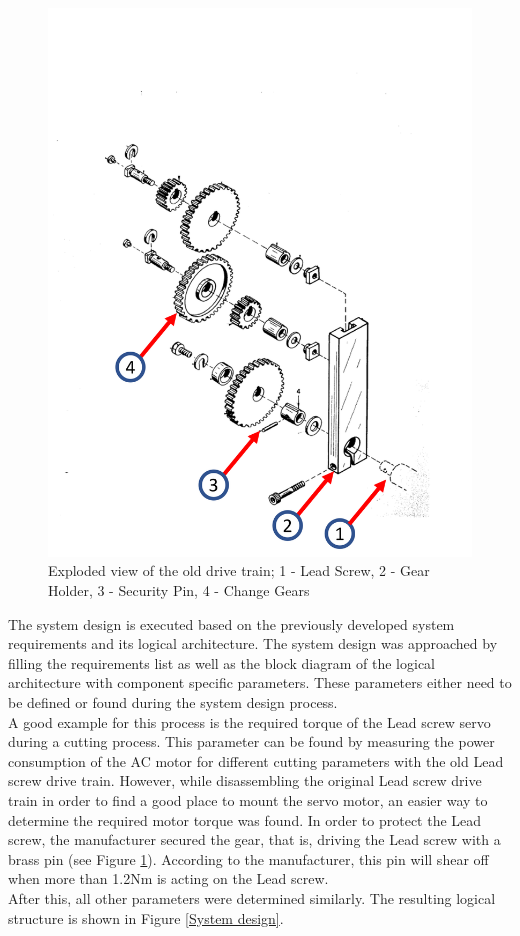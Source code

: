 \begin{figure}
    \begin{center}
    \includegraphics[width=12cm]{Pictures/SecPin.png}
    \caption[Exploded view of the old drive train]{Exploded view of the old drive train; 1 - Lead Screw, 2 - Gear Holder, 3 - Security Pin, 4 - Change Gears}
    \label{SecPin}
    \end{center}
\end{figure}
 
The system design is executed based on the previously developed system requirements and its logical architecture. The system design was approached by filling the requirements list as well as the block diagram of the logical architecture with component specific parameters. These parameters either need to be defined or found during the system design process.\\
A good example for this process is the required torque of the Lead screw servo during a cutting process. This parameter can be found by measuring the power consumption of the AC motor for different cutting parameters with the old Lead screw drive train. However, while disassembling the original Lead screw drive train in order to find a good place to mount the servo motor, an easier way to determine the required motor torque was found. In order to protect the Lead screw, the manufacturer secured the gear, that is, driving the Lead screw with a brass pin (see Figure \ref{SecPin}). According to the manufacturer, this pin will shear off when more than 1.2Nm is acting on the Lead screw.\\
After this, all other parameters were determined similarly. The resulting logical structure is shown in Figure \ref{System design}.
 
